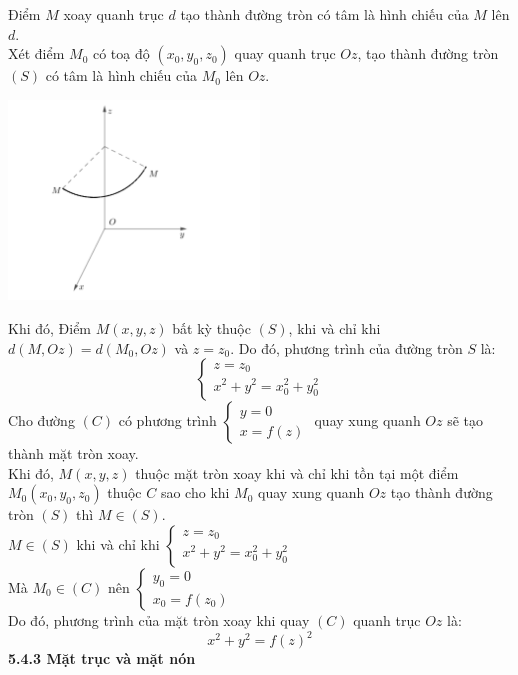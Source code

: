 \documentclass[12pt,a4]{article}
\begin{document}
\begin{titlepage}
Điểm $M$ xoay quanh trục $d$ tạo thành đường tròn có tâm là hình chiếu của $M$ lên $d$.\\
Xét điểm $M_0$ có toạ độ $(x_0,y_0,z_0)$ quay quanh trục $Oz$, tạo thành đường tròn $(S)$ có tâm là hình chiếu của $M_0$ lên $Oz$.\\
\begin{center}
    \includegraphics[width=0.5\textwidth]{image/tronxoay.png}
\end{center}
Khi đó, Điểm $M(x,y,z)$ bất kỳ thuộc $(S)$, khi và chỉ khi $d(M,Oz) = d(M_0,Oz)$ và $z = z_0$. Do đó, phương trình của đường tròn $S$ là:
\[
\begin{cases} z = z_0\\x^2 + y^2 = x_0^2 + y_0^2\end{cases}
\]
Cho đường $(C)$ có phương trình $\begin{cases} y = 0\\x = f(z)\end{cases}$ quay xung quanh $Oz$ sẽ tạo thành mặt tròn xoay.\\
Khi đó, $M(x,y,z)$ thuộc mặt tròn xoay khi và chỉ khi tồn tại một điểm $M_0(x_0,y_0,z_0)$ thuộc $C$ sao cho khi $M_0$ quay xung quanh $Oz$ tạo thành đường tròn $(S)$ thì $M \in (S).$\\
$M \in (S)$ khi và chỉ khi $\begin{cases} z = z_0\\x^2 + y^2 = x_0^2 + y_0^2\end{cases}$\\
Mà $M_0 \in (C)$ nên $\begin{cases} y_0 = 0\\x_0 = f(z_0)\end{cases}$\\
Do đó, phương trình của mặt tròn xoay khi quay $(C)$ quanh trục $Oz$ là:\
\[
x^2 + y^2 = f(z)^2
\]
\vspace{0.2cm}
\textbf{5.4.3 Mặt trục và mặt nón}\\
\vspace{0.2cm}

\end{titlepage}
\end{document}

